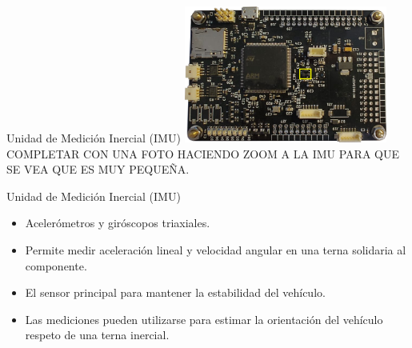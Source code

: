 
\begin{frame}{Unidad de Medición Inercial (IMU)}
	\includegraphics[width=0.5\textwidth]{img/IMU.png}
	COMPLETAR CON UNA FOTO HACIENDO ZOOM A LA IMU PARA QUE SE VEA QUE ES MUY PEQUEÑA.
\end{frame}

\begin{frame}{Unidad de Medición Inercial (IMU)}
	\begin{itemize}
		\item Acelerómetros y giróscopos triaxiales.
		\item Permite medir aceleración lineal y velocidad angular en una terna solidaria al componente.
		\item El sensor principal para mantener la estabilidad del vehículo.
		\item Las mediciones pueden utilizarse para estimar la orientación del vehículo respeto de una terna inercial.
	\end{itemize}
\end{frame}

